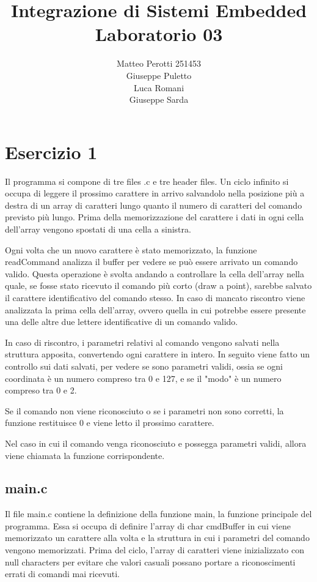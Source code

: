 \documentclass[a4paper]{article}
\title{Integrazione di Sistemi Embedded\\ Laboratorio 03}
\author{Matteo Perotti 251453\\ Giuseppe Puletto\\ Luca Romani\\ Giuseppe Sarda}
\begin{document}
\maketitle

\newpage

\section{Esercizio 1}
Il programma si compone di tre files .c e tre header files.
Un ciclo infinito si occupa di leggere il prossimo carattere in arrivo salvandolo nella posizione più a destra
di un array di caratteri lungo quanto il numero di caratteri del comando previsto più lungo. Prima della
memorizzazione del carattere i dati in ogni cella dell'array vengono spostati di una cella a sinistra.

Ogni volta che un nuovo carattere è stato memorizzato, la funzione readCommand analizza il buffer per vedere
se può essere arrivato un comando valido. Questa operazione è svolta andando a controllare la cella dell'array
nella quale, se fosse stato ricevuto il comando più corto (draw a point), sarebbe salvato il carattere
identificativo del comando stesso. In caso di mancato riscontro viene analizzata la prima cella dell'array, ovvero
quella in cui potrebbe essere presente una delle altre due lettere identificative di un comando valido.

In caso di riscontro, i parametri relativi al comando vengono salvati nella struttura apposita, convertendo ogni 
carattere in intero. In seguito viene fatto un controllo sui dati salvati, per vedere se sono parametri validi,
ossia se ogni coordinata è un numero compreso tra 0 e 127, e se il "modo" è un numero compreso tra 0 e 2.

Se il comando non viene riconosciuto o se i parametri non sono corretti, la funzione restituisce 0 e viene letto il
prossimo carattere.

Nel caso in cui il comando venga riconosciuto e possegga parametri validi, allora viene chiamata la funzione 
corrispondente.
	\subsection{main.c}
		Il file main.c contiene la definizione della funzione main, la funzione principale del programma. 
		Essa si occupa di definire l'array di char cmdBuffer in cui viene memorizzato un carattere alla volta e
		la struttura in cui i parametri del comando vengono memorizzati.
		Prima del ciclo, l'array di caratteri viene inizializzato con null characters per evitare che valori
		casuali possano portare a riconoscimenti errati di comandi mai ricevuti.
\end{document}
